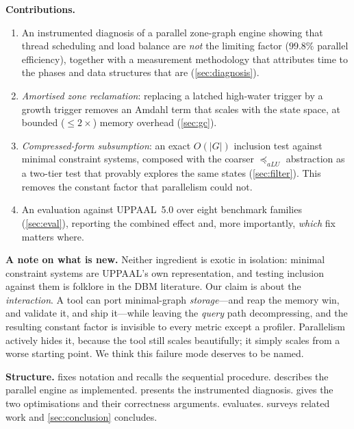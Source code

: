 \medskip
\noindent\textbf{Contributions.}
\begin{enumerate}
  \item An instrumented diagnosis of a parallel zone-graph engine showing that
        thread scheduling and load balance are \emph{not} the limiting factor
        ($99.8\%$ parallel efficiency), together with a measurement methodology
        that attributes time to the phases and data structures that are
        (\cref{sec:diagnosis}).
  \item \emph{Amortised zone reclamation}: replacing a latched high-water
        trigger by a growth trigger removes an Amdahl term that scales with the
        state space, at bounded ($\leq 2\times$) memory overhead
        (\cref{sec:gc}).
  \item \emph{Compressed-form subsumption}: an exact $O(|G|)$ inclusion test
        against minimal constraint systems, composed with the coarser
        $\preceq_{aLU}$ abstraction as a two-tier test that provably explores the
        same states (\cref{sec:filter}).  This removes the constant factor that
        parallelism could not.
  \item An evaluation against UPPAAL~5.0 over eight benchmark families
        (\cref{sec:eval}), reporting the combined effect and, more importantly,
        \emph{which} fix matters where.
\end{enumerate}

\medskip
\noindent\textbf{A note on what is new.}  Neither ingredient is exotic in
isolation: minimal constraint systems are UPPAAL's own representation, and
testing inclusion against them is folklore in the DBM literature.  Our claim is
about the \emph{interaction}.  A tool can port minimal-graph \emph{storage}---and
reap the memory win, and validate it, and ship it---while leaving the
\emph{query} path decompressing, and the resulting constant factor is invisible
to every metric except a profiler.  Parallelism actively hides it, because the
tool still scales beautifully; it simply scales from a worse starting point.  We
think this failure mode deserves to be named.

\medskip
\noindent\textbf{Structure.}
 fixes notation and recalls the sequential procedure.
 describes the parallel engine as implemented.
 presents the instrumented diagnosis.
 gives the two optimisations and their correctness arguments.
 evaluates.
 surveys related work and \cref{sec:conclusion} concludes.
